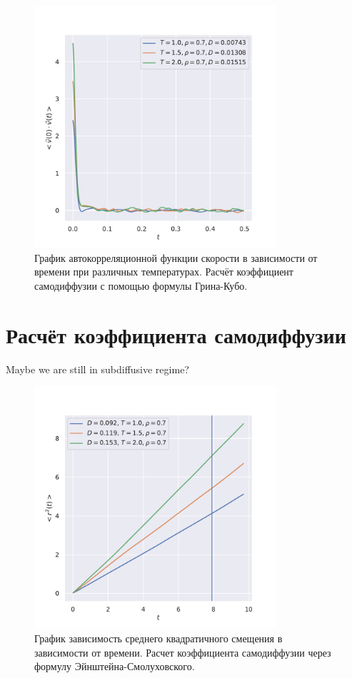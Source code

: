 \documentclass[a4paper,12pt]{article}
\begin{document}
\begin{figure}[H]
    \centering
    \includegraphics[width=0.8\textwidth]{../../media/vac.pdf}
\caption{График автокорреляционной функции
    скорости в зависимости от времени при различных
температурах. Расчёт коэффициент самодиффузии с
помощью формулы Грина-Кубо.}
\end{figure}

\section{Расчёт коэффициента самодиффузии}

{\color{red} Maybe we are still in subdiffusive regime?}

\begin{figure}[H]
    \centering
    \includegraphics[width=0.8\textwidth]{../../media/diffusion.pdf}
\caption{График зависимость среднего квадратичного
смещения в зависимости от времени. Расчет коэффициента
самодиффузии через формулу Эйнштейна-Смолуховского.}
\end{figure}
\end{document}
